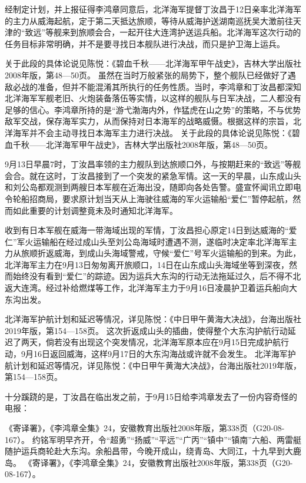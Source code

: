 \documentclass[12pt,UTF8]{ctexbook}
\begin{document}
经制定计划，并上报征得李鸿章同意后，北洋海军提督丁汝昌于12日亲率北洋海军的主力从威海起航，定于第二天抵达旅顺，等待从威海护送湖南巡抚吴大澂前往天津的“致远”等舰来到旅顺会合，一起开往大连湾护送运兵船。北洋海军这次行动的任务目标非常明确，并不是要寻找日本舰队进行决战，而只是护卫海上运兵。

关于此段的具体论说见陈悦：《碧血千秋——北洋海军甲午战史》，吉林大学出版社2008年版，第48—50页。
虽然在当时万般紧张的局势下，整个舰队已经做好了遇敌必战的准备，但并不能混淆其所执行的任务性质。当时，李鸿章和丁汝昌都深知北洋海军军舰老旧、火炮装备落伍等实情，以这样的舰队与日军决战，二人都没有足够的信心。李鸿章所持的是“游弋渤海内外，作猛虎在山之势”的策略，不与优势敌军交战，保存海军实力，从而保持对日本海军的战略威慑。根据这样的宗旨，北洋海军并不会主动寻找日本海军主力进行决战。 关于此段的具体论说见陈悦：《碧血千秋——北洋海军甲午战史》，吉林大学出版社2008年版，第48—50页。

9月13日早晨7时，丁汝昌率领的主力舰队到达旅顺口外，与按期赶来的“致远”等舰会合。就在这时，丁汝昌接到了一个突发的紧急军情。这一天的早晨，山东成山头和刘公岛都观测到两艘日本军舰在近海出没，随即向各处告警。盛宣怀闻讯立即电令轮船招商局，要求原计划当天从上海驶往威海的军火运输船“爱仁”暂停起航，然而如此重要的计划调整竟未及时通知北洋海军。

收到有日本军舰在威海一带海域出现的军情，丁汝昌担心原定14日到达威海的“爱仁”军火运输船在经过成山头至刘公岛海域时遭遇不测，遂临时决定率北洋海军主力从旅顺折返威海，到成山头海域警戒，守候“爱仁”号军火运输船的到来。为此，北洋海军主力在9月13日匆匆离开旅顺口，14日在山东成山头海域坐等到深夜，然而始终没有看到“爱仁”的踪迹。因为运兵大东沟的行动无法拖延过久，后不得不北返大连湾。经过补给燃煤等工作，北洋海军主力于9月16日凌晨护卫着运兵船向大东沟出发。

北洋海军护航计划和延迟等情况，详见陈悦：《中日甲午黄海大决战》，台海出版社2019年版，第154—158页。
这次折返成山头的插曲，使得整个大东沟护航行动延迟了两天，倘若没有出现这个突发情况，北洋海军原本应在9月15日完成护航行动，9月16日返回威海，这样9月17日的大东沟海战或许就不会发生。 北洋海军护航计划和延迟等情况，详见陈悦：《中日甲午黄海大决战》，台海出版社2019年版，第154—158页。

十分蹊跷的是，丁汝昌在临出发之前，于9月15日给李鸿章发去了一份内容奇怪的电报：

《寄译署》，《李鸿章全集》24，安徽教育出版社2008年版，第338页（G20-08-167）。
约铭军明早齐开，令“超勇”“扬威”“平远”“广丙”“镇中”“镇南”六船、两雷艇随护运兵商轮赴大东沟。余船昌带，今晚开成山，绕青岛、大同江，十九早到大鹿岛。 《寄译署》，《李鸿章全集》24，安徽教育出版社2008年版，第338页（G20-08-167）。
\end{document}
